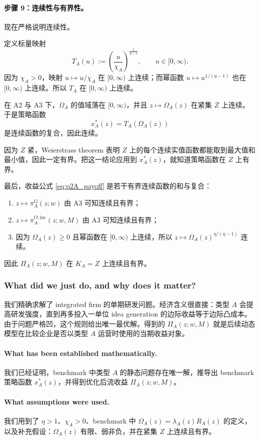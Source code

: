 \paragraph{步骤 9：连续性与有界性。}
现在严格说明连续性。

定义标量映射
\[
T_A(u):=\left(\frac{u}{\chi_A}\right)^{\frac{1}{\eta-1}},
\qquad u\in[0,\infty).
\]
因为 $\chi_A>0$，映射 $u\mapsto u/\chi_A$ 在 $[0,\infty)$ 上连续；而幂函数 $u\mapsto u^{1/(\eta-1)}$ 也在 $[0,\infty)$ 上连续。所以 $T_A$ 在 $[0,\infty)$ 上连续。

在 A2 与 A3 下，$\Omega_A$ 的值域落在 $[0,\infty)$，并且 $z\mapsto \Omega_A(z)$ 在紧集 $Z$ 上连续。于是策略函数
\[
x_A^*(z)=T_A(\Omega_A(z))
\]
是连续函数的复合，因此连续。

因为 $Z$ 紧，Weierstrass theorem 表明 $Z$ 上的每个连续实值函数都能取到最大值和最小值，因此一定有界。把这一结论应用到 $x_A^*(z)$，就知道策略函数在 $Z$ 上有界。

最后，收益公式 \eqref{eq:p2A_payoff} 是若干有界连续函数的和与复合：
\begin{enumerate}
    \item $z\mapsto \pi_A^G(z;w)$ 由 A3 可知连续且有界；
    \item $z\mapsto \pi_A^{O,\mathrm{inc}}(z;w,M)$ 由 A3 可知连续且有界；
    \item 因为 $\Omega_A(z)\ge 0$ 且幂函数在 $[0,\infty)$ 上连续，所以 $z\mapsto \Omega_A(z)^{\eta/(\eta-1)}$ 连续。
\end{enumerate}
因此 $\Pi_A(z;w,M)$ 在 $K_A=Z$ 上连续且有界。

\subsubsection*{What did we just do, and why does it matter?}
我们精确求解了 integrated firm 的单期研发问题。经济含义很直接：类型 $A$ 会提高研发强度，直到再多投入一单位 idea generation 的边际收益等于边际凸成本。由于问题严格凹，这个规则给出唯一最优解。得到的 $\Pi_A(z;w,M)$ 就是后续动态模型在比较企业是否以类型 $A$ 运营时使用的当期收益对象。

\paragraph{What has been established mathematically.}
我们已经证明，benchmark 中类型 $A$ 的静态问题存在唯一解，推导出 benchmark 策略函数 $x_A^*(z)$，并得到优化后流收益 $\Pi_A(z;w,M)$。

\paragraph{What assumptions were used.}
我们用到了 $\eta>1$、$\chi_A>0$、benchmark 中 $\Omega_A(z)=\lambda_A(z)R_A(z)$ 的定义，以及补充假设：$\Omega_A(z)$ 有限、弱非负，并在紧集 $Z$ 上连续且有界。

